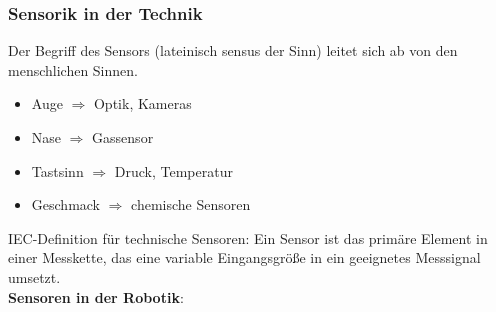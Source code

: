 \subsubsection{Sensorik in der Technik}
Der Begriff des Sensors (lateinisch \glqq sensus\grqq{} der Sinn) leitet sich ab von den menschlichen Sinnen.
\begin{itemize}
\setlength\itemsep{0em}
\item Auge $\Rightarrow$ Optik, Kameras
\item Nase $\Rightarrow$ Gassensor
\item Tastsinn $\Rightarrow$ Druck, Temperatur
\item Geschmack $\Rightarrow$ chemische Sensoren
\end{itemize}
IEC-Definition für technische Sensoren:
\glqq Ein Sensor ist das primäre Element in einer Messkette, das eine variable Eingangsgröße in ein geeignetes Messsignal umsetzt.\grqq \\
\textbf{Sensoren in der Robotik}:
